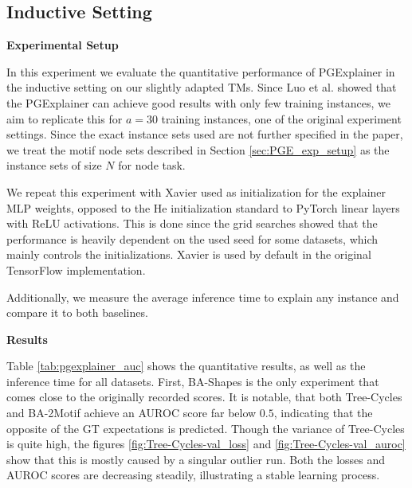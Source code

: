 \subsection{Inductive Setting}
\label{sec:ind_results}

\textbf{Experimental Setup} \par
In this experiment we evaluate the quantitative performance of PGExplainer in the inductive setting on our slightly adapted \acp{TM}. Since Luo et al. \cite{luo2020parameterized} showed that the PGExplainer can achieve good results with only few training instances, we aim to replicate this for $a=30$ training instances, one of the original experiment settings. Since the exact instance sets used are not further specified in the paper, we treat the motif node sets described in Section \ref{sec:PGE_exp_setup} as the instance sets of size $N$ for node task.

We repeat this experiment with Xavier \cite{glorot2010understanding} used as initialization for the explainer MLP weights, opposed to the He \cite{he2015delving} initialization standard to PyTorch linear layers with ReLU activations. This is done since the grid searches showed that the performance is heavily dependent on the used seed for some datasets, which mainly controls the initializations. Xavier is used by default in the original TensorFlow \cite{tensorflow2015-whitepaper} implementation.

Additionally, we measure the average inference time to explain any instance and compare it to both baselines. \bigskip


\textbf{Results}\par
Table \ref{tab:pgexplainer_auc} shows the quantitative results, as well as the inference time for all datasets. First, BA-Shapes is the only experiment that comes close to the originally recorded scores. It is notable, that both Tree-Cycles and BA-2Motif achieve an AUROC score far below $0.5$, indicating that the opposite of the \ac{GT} expectations is predicted. Though the variance of Tree-Cycles is quite high, the figures \ref{fig:Tree-Cycles-val_loss} and \ref{fig:Tree-Cycles-val_auroc} show that this is mostly caused by a singular outlier run. Both the losses and AUROC scores are decreasing steadily, illustrating a stable learning process. 

